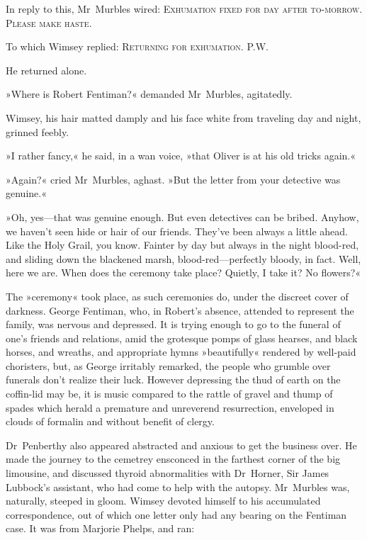 In reply to this, Mr~Murbles wired: \textsc{Exhumation fixed for day after to-morrow. Please make haste.}

To which Wimsey replied: \textsc{Returning for exhumation. P\@.W\@.}

He returned alone.

»Where is Robert Fentiman?« demanded Mr~Murbles, agitatedly.

Wimsey, his hair matted damply and his face white from traveling day and night, grinned feebly.

»I rather fancy,« he said, in a wan voice, »that Oliver is at his old tricks again.«

»Again?« cried Mr~Murbles, aghast. »But the letter from your detective was genuine.«

»Oh, yes—that was genuine enough. But even detectives can be bribed. Anyhow, we haven't seen hide or hair of our friends. They've been always a little ahead. Like the Holy Grail, you know. Fainter by day but always in the night blood-red, and sliding down the blackened marsh, blood-red—perfectly bloody, in fact. Well, here we are. When does the ceremony take place? Quietly, I take it? No flowers?«

The »ceremony« took place, as such ceremonies do, under the discreet cover of darkness. George Fentiman, who, in Robert's absence, attended to represent the family, was nervous and depressed. It is trying enough to go to the funeral of one's friends and relations, amid the grotesque pomps of glass hearses, and black horses, and wreaths, and appropriate hymns »beautifully« rendered by well-paid choristers, but, as George irritably remarked, the people who grumble over funerals don't realize their luck. However depressing the thud of earth on the coffin-lid may be, it is music compared to the rattle of gravel and thump of spades which herald a premature and unreverend resurrection, enveloped in clouds of formalin and without benefit of clergy.

Dr~Penberthy also appeared abstracted and anxious to get the business over. He made the journey to the cemetrey ensconced in the farthest corner of the big limousine, and discussed thyroid abnormalities with Dr~Horner, Sir James Lubbock's assistant, who had come to help with the autopsy. Mr~Murbles was, naturally, steeped in gloom. Wimsey devoted himself to his accumulated correspondence, out of which one letter only had any bearing on the Fentiman case. It was from Marjorie Phelps, and ran:

